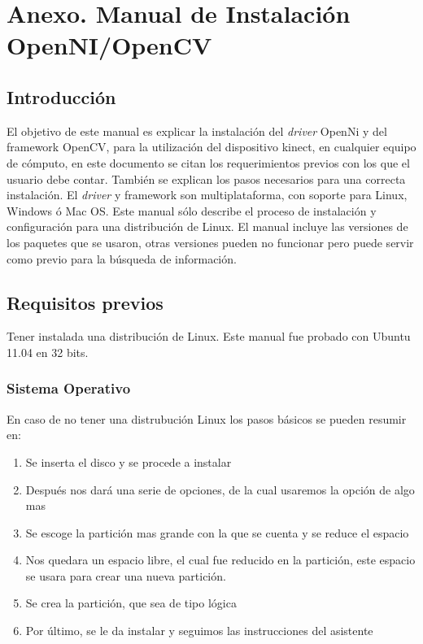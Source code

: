 \chapter{Anexo. Manual de Instalación OpenNI/OpenCV}

\section{Introducción}

El objetivo de este manual es explicar la instalación del {\it driver} OpenNi y del framework OpenCV, 
para la utilización del dispositivo kinect, en cualquier equipo de cómputo, 
en este documento se citan los requerimientos previos con los que el usuario debe contar. 
También se explican los pasos necesarios para una correcta instalación.
El {\it driver} y framework son multiplataforma, con soporte para Linux, Windows ó Mac OS.
Este manual sólo describe el proceso de instalación y configuración para una distribución de Linux.
El manual incluye las versiones de los paquetes que se usaron, otras versiones pueden no funcionar
 pero puede servir como previo para la búsqueda de información.
 
 
\section{Requisitos previos}

Tener instalada una distribución de Linux. 
Este manual fue probado con Ubuntu 11.04 en 32 bits.

\subsection{Sistema Operativo}

En caso de no tener una distrubución Linux los pasos básicos se pueden resumir en:
\begin{enumerate}
\item Se inserta el disco y se procede a instalar
\item Después nos dará una serie de opciones, de la cual usaremos la opción de algo mas
\item Se escoge la partición mas grande  con la que se cuenta y se reduce el espacio
\item Nos quedara un espacio libre, el cual fue reducido en la partición, este espacio se usara para
crear una nueva partición.
\item Se crea la partición, que sea de tipo lógica
\item Por último, se le da instalar y seguimos las instrucciones del asistente
\end{enumerate}

